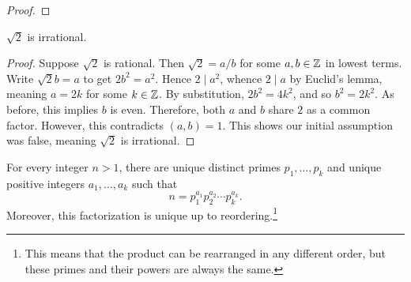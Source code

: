 \documentclass[11pt,a4paper]{article}
\begin{document}
\begin{proof}
    
\end{proof}

\begin{prop}
    \(\sqrt{2}\) is irrational.
\end{prop}

\begin{proof}
    Suppose \(\sqrt{2}\) is rational. 
    Then \(\sqrt{2}=a/b\) for some \(a,b\in \mathbb{Z}\) in lowest terms.
    Write \(\sqrt{2} b = a\) to get \(2b^2 = a^2\).
    Hence \(2\mid a^2\),
    whence \(2\mid a\) by Euclid's lemma, meaning  \(a=2k\) for some \(k\in\mathbb{Z}\).
    By substitution, \(2b^2 = 4k^2\), and so \(b^2= 2k^2\).
    As before, this implies  \(b\) is even.
    Therefore,  both \(a\) and \(b\) share \(2\) as a common factor. 
    However, this  contradicts \((a,b) = 1\).
    This shows our initial assumption was false, meaning \(\sqrt{2}\) is irrational.
\end{proof}


\begin{teo}
   For every integer $n>1$, there are unique distinct primes $p_1, \ldots, p_k $ and unique positive integers $a_1, \ldots, a_k $ such that
\[
n=p_1^{a_1} p_2^{a_2} \cdots p_k^{a_k}.
\] 
Moreover, this factorization is unique up to reordering.\footnote{ This means that the product  can be rearranged in any  different order, but these primes and their powers are always the same.}
\end{teo}
\end{document}
